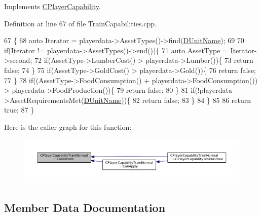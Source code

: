 Implements \hyperlink{classCPlayerCapability_aa83b1e1fcaff2985c378132d679154ea}{C\+Player\+Capability}.



Definition at line 67 of file Train\+Capabilities.\+cpp.


\begin{DoxyCode}
67                                                                                                            
                     \{
68     \textcolor{keyword}{auto} Iterator = playerdata->AssetTypes()->find(\hyperlink{classCPlayerCapabilityTrainNormal_aed40686355e78c151910e23ea2d9d32c}{DUnitName});
69     
70     \textcolor{keywordflow}{if}(Iterator != playerdata->AssetTypes()->end())\{
71         \textcolor{keyword}{auto} AssetType = Iterator->second;
72         \textcolor{keywordflow}{if}(AssetType->LumberCost() > playerdata->Lumber())\{
73             \textcolor{keywordflow}{return} \textcolor{keyword}{false};   
74         \}
75         \textcolor{keywordflow}{if}(AssetType->GoldCost() > playerdata->Gold())\{
76             \textcolor{keywordflow}{return} \textcolor{keyword}{false};   
77         \}
78         \textcolor{keywordflow}{if}((AssetType->FoodConsumption() + playerdata->FoodConsumption()) > playerdata->FoodProduction())\{
79             \textcolor{keywordflow}{return} \textcolor{keyword}{false};    
80         \}
81         \textcolor{keywordflow}{if}(!playerdata->AssetRequirementsMet(\hyperlink{classCPlayerCapabilityTrainNormal_aed40686355e78c151910e23ea2d9d32c}{DUnitName}))\{
82             \textcolor{keywordflow}{return} \textcolor{keyword}{false};
83         \}
84     \}
85     
86     \textcolor{keywordflow}{return} \textcolor{keyword}{true};
87 \}
\end{DoxyCode}
Here is the caller graph for this function\+:\nopagebreak
\begin{figure}[H]
\begin{center}
\leavevmode
\includegraphics[width=350pt]{classCPlayerCapabilityTrainNormal_ac49cf646b94220844a03b7c3a8a7f215_icgraph}
\end{center}
\end{figure}


\subsection{Member Data Documentation}
\hypertarget{classCPlayerCapabilityTrainNormal_a20934470ff6a9ba1cba5969dba8102e4}{}\label{classCPlayerCapabilityTrainNormal_a20934470ff6a9ba1cba5969dba8102e4} 
